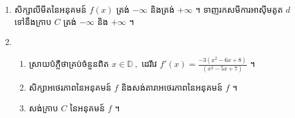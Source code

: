 \documentclass{officialexam}
\begin{document}
\begin{enumerate}[I]
\begin{enumerate}[1]
  		\item សិក្សាលីមីតនៃអនុគមន៍ $f(x)$ ត្រង់ $-\infty$ និងត្រង់ $+\infty$ ។ ទាញរកសមីការអាស៊ីមតូត $d$ ទៅនឹងក្រាប $C$ ត្រង់ $-\infty$ និង $+\infty$ ។
  		\item \begin{enumerate}[k]
  			\item ស្រាយបំភ្លឺថាគ្រប់ចំនួនពិត $x\in\mathbb{D}~,$ ដេរីវេ $f'(x)=\frac{-3\left(x^2-6x+8\right)}{\left(x^2-5x+7\right)}$ ។
  			\item សិក្សាអថេរភាពនៃអនុគមន៍ $f$ និងសង់តារាអថេរភាពនៃអនុគមន៍ $f$ ។
  			\item សង់ក្រាប $C$ នៃអនុគមន៍ $f$ ។
  		\end{enumerate}
  	\end{enumerate}
  \end{enumerate}
\newpage
 {\maketitle}
  
\end{document}
